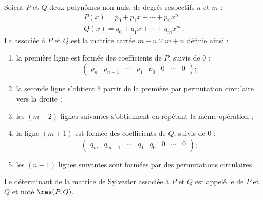\begin{definition}        \label{DEFooHGZDooXIvTaP}
    Soient \( P\) et \( Q\) deux polynômes non nuls, de degrés respectifs \( n\) et \( m\) :
    \begin{subequations}
        \begin{align}
            P(x)=p_0+p_1x+\cdots +p_nx^n \\
            Q(x)=q_0+q_1x+\cdots +q_mx^m.
        \end{align}
    \end{subequations}
    La  associée à \( P\) et \( Q\) est la matrice carrée \( m+n\times m+n\) définie ainsi :
    \begin{enumerate}
        \item
            la première ligne est formée des coefficients de \( P\), suivis de 0 :
            \begin{equation}
                \begin{pmatrix} p_n & p_{n-1} & \cdots & p_1 & p_0 & 0 & \cdots & 0 \end{pmatrix} ;
            \end{equation}
        \item la seconde ligne s'obtient à partir de la première par permutation circulaire vers la droite ;
        \item les \( (m-2)\) lignes suivantes s'obtiennent en répétant la même opération ;
        \item la ligne \( (m+1)\) est formée des coefficients de \( Q\), suivis de 0 :
            \begin{equation}
                \begin{pmatrix} q_m & q_{m-1} & \cdots & q_1 & q_0 & 0 & \cdots & 0 \end{pmatrix} ;
            \end{equation}
        \item les \( (n-1)\) lignes suivantes sont formées par des permutations circulaires.
    \end{enumerate}
    Le déterminant de la matrice de Sylvester associée à \( P\) et \( Q\) est appelé le  de \( P\) et \( Q\) et noté \( \res(P,Q)\).
\end{definition}


